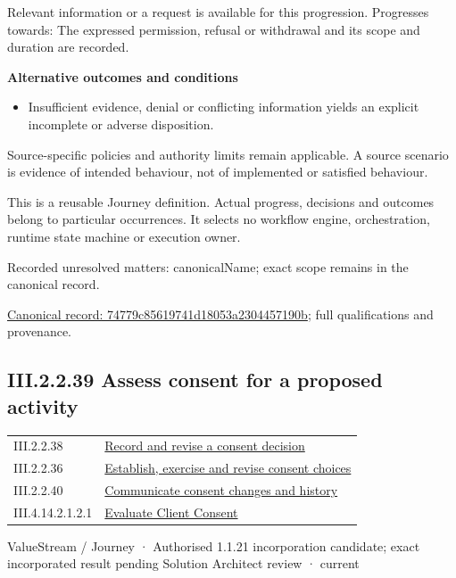 Relevant information or a request is available for this progression. Progresses towards: The expressed permission, refusal or withdrawal and its scope and duration are recorded.



\par\medskip\textbf{Alternative outcomes and conditions}\par


\begin{itemize}


\item Insufficient evidence, denial or conflicting information yields an explicit incomplete or adverse disposition.

\end{itemize}


Source-specific policies and authority limits remain applicable. A source scenario is evidence of intended behaviour, not of implemented or satisfied behaviour.



This is a reusable Journey definition. Actual progress, decisions and outcomes belong to particular occurrences. It selects no workflow engine, orchestration, runtime state machine or execution owner.


{\small Recorded unresolved matters: canonicalName; exact scope remains in the canonical record.}\par
{\footnotesize \href{../../../../../../../continuum/strategy/value-stream/74779c85619741d18053a2304457190b.md}{Canonical record: 74779c85619741d18053a2304457190b}; full qualifications and provenance.}\par
\subsection*{III.2.2.39 Assess consent for a proposed activity}
\label{navigation:III.2.2.39}

\begin{longtable}{p{.22\linewidth}p{.73\linewidth}}
III.2.2.38 & \hyperref[element:74779c85619741d18053a2304457190b]{Record and revise a consent decision} \\
III.2.2.36 & \hyperref[element:850bba32295c4e53b20036b80f77f491]{Establish, exercise and revise consent choices} \\
III.2.2.40 & \hyperref[element:9356b876f2aa427f989ad4f1b7f2fa4c]{Communicate consent changes and history} \\
III.4.14.2.1.2.1 & \hyperref[element:b9e978a651cf4ff3bb690af50b8528cd]{Evaluate Client Consent} \\
\end{longtable}
\label{element:17c66eb17d6040d09e250e787be71719}
{\small ValueStream / Journey · Authorised 1.1.21 incorporation candidate; exact incorporated result pending Solution Architect review · current}\par

